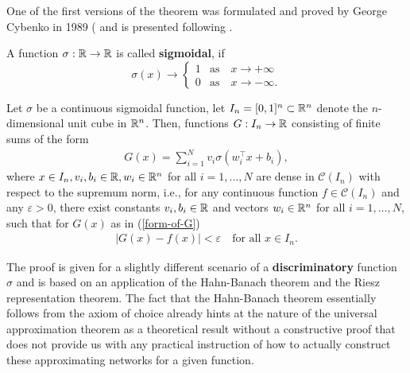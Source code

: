 One of the first versions of the theorem was formulated and proved by George Cybenko in 1989 (\cite{Cybenko1989} and is presented following \cite[pp.~305-307]{Cybenko1989}.

\begin{definition}
	A function $\sigma: \mathbb{R} \to \mathbb{R}$ is called \textbf{sigmoidal}, if 
	\begin{equation*}
		\sigma(x) \to \begin{cases}
		1 & \text{as} \quad x\to +\infty \\
		0 & \text{as} \quad x\to -\infty.
		\end{cases}
	\end{equation*}
\end{definition}

\begin{theorem}\label{universal_approx_thm}
	Let $\sigma$ be a continuous sigmoidal function, let $I_n = [0,1]^n \subset \mathbb{R}^n$ 
	denote the $n$-dimensional unit cube in $\mathbb{R}^n$. Then, functions $G: I_n \to \mathbb{R}$ consisting of finite sums of the form 
	\begin{equation}\label{form-of-G}
	\begin{split}
 		G(x) = \sum_{i=1}^{N} v_i \sigma(w_i^{\top}x + b_i),
	\end{split}
 	\end{equation}
	where $x\in I_n, v_i, b_i \in \mathbb{R}, w_i \in \mathbb{R}^n$ for all $i=1,\dots, N$ are dense in $\mathcal{C}(I_n)$ with respect to the supremum norm, i.e., for any continuous function $f\in \mathcal{C}(I_n)$ and any $\varepsilon >0$, there exist constants $v_i, b_i \in \mathbb{R}$ and vectors $w_i \in \mathbb{R}^n$ for all $i=1,\dots, N$, such that for $G(x)$ as in (\ref{form-of-G})
	\begin{equation*}
	\begin{split}
		\mid G(x) - f(x) \mid < \varepsilon \quad \text{for all } x\in I_n. 
	\end{split}
	\end{equation*}
\end{theorem}

The proof is given for a slightly different scenario of a \textbf{discriminatory} function $\sigma$ and is based on an application of the Hahn-Banach theorem and the Riesz representation theorem. The fact that the Hahn-Banach theorem essentially follows from the axiom of choice already hints at the nature of the universal approximation theorem as a theoretical result without a constructive proof that does not provide us with any practical instruction of how to actually construct these approximating networks for a given function. 

